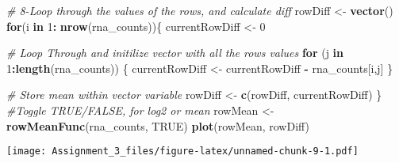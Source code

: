 \documentclass[]{article}
\newenvironment{Shaded}{\begin{snugshade}}{\end{snugshade}}
\newcommand{\KeywordTok}[1]{\textcolor[rgb]{0.13,0.29,0.53}{\textbf{#1}}}
\newcommand{\DecValTok}[1]{\textcolor[rgb]{0.00,0.00,0.81}{#1}}
\newcommand{\StringTok}[1]{\textcolor[rgb]{0.31,0.60,0.02}{#1}}
\newcommand{\CommentTok}[1]{\textcolor[rgb]{0.56,0.35,0.01}{\textit{#1}}}
\newcommand{\OtherTok}[1]{\textcolor[rgb]{0.56,0.35,0.01}{#1}}
\newcommand{\ControlFlowTok}[1]{\textcolor[rgb]{0.13,0.29,0.53}{\textbf{#1}}}
\newcommand{\OperatorTok}[1]{\textcolor[rgb]{0.81,0.36,0.00}{\textbf{#1}}}
\newcommand{\NormalTok}[1]{#1}
\begin{document}
\begin{Shaded}
\begin{Highlighting}[]
\CommentTok{# 8-Loop through the values of the rows, and calculate diff}
\NormalTok{rowDiff <-}\StringTok{ }\KeywordTok{vector}\NormalTok{()}
\ControlFlowTok{for}\NormalTok{(i }\ControlFlowTok{in} \DecValTok{1}\OperatorTok{:}\StringTok{ }\KeywordTok{nrow}\NormalTok{(rna_counts))\{}
\NormalTok{  currentRowDiff <-}\StringTok{ }\DecValTok{0}
  
  \CommentTok{# Loop Through and initilize vector with all the rows values}
  \ControlFlowTok{for}\NormalTok{ (j }\ControlFlowTok{in} \DecValTok{1}\OperatorTok{:}\KeywordTok{length}\NormalTok{(rna_counts)) \{}
\NormalTok{    currentRowDiff <-}\StringTok{ }\NormalTok{currentRowDiff }\OperatorTok{-}\StringTok{ }\NormalTok{rna_counts[i,j]}
\NormalTok{  \}}

  
  \CommentTok{# Store mean within vector variable}
\NormalTok{  rowDiff <-}\StringTok{ }\KeywordTok{c}\NormalTok{(rowDiff, currentRowDiff)}
\NormalTok{\}}
\CommentTok{#Toggle TRUE/FALSE, for log2 or mean}
\NormalTok{rowMean <-}\StringTok{ }\KeywordTok{rowMeanFunc}\NormalTok{(rna_counts, }\OtherTok{TRUE}\NormalTok{)}
\KeywordTok{plot}\NormalTok{(rowMean, rowDiff)}
\end{Highlighting}
\end{Shaded}

\texttt{[image: Assignment\_3\_files/figure-latex/unnamed-chunk-9-1.pdf]}
\end{document}
